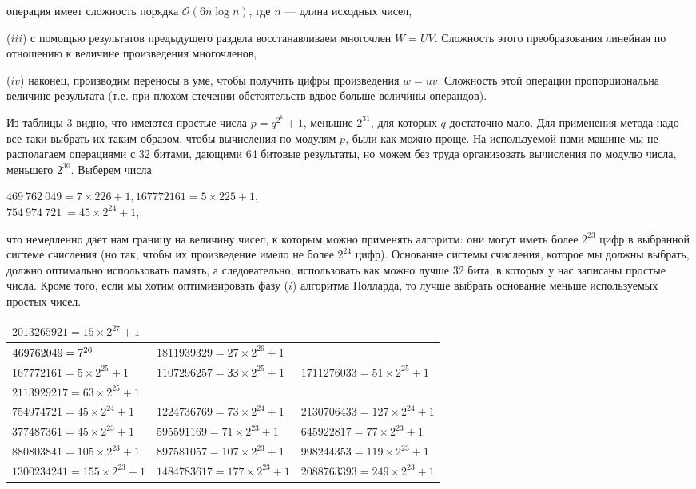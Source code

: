 \noindent операция имеет сложность порядка $\mathcal{O}(6n\log{}n)$, где $n$ --- длина исходных чисел, \par
  ($iii$) с помощью результатов предыдущего раздела 
восстанавливаем многочлен $W = UV$. Сложность этого преобразования линейная по отношению к величине произведения многочленов, \par
 ($iv$) наконец, производим переносы в уме, чтобы получить цифры
произведения $w = uv$. Сложность этой операции пропорциональна 
величине результата (т.е. при плохом стечении обстоятельств вдвое больше
величины операндов).\par
 Из таблицы 3 видно, что имеются простые числа $p = q^{2^{k}} + 1$, 
меньшие $2^{31}$, для которых $q$ достаточно мало. Для применения метода надо
все-таки выбрать их таким образом, чтобы вычисления по модулям $p$,
были как можно проще. На используемой нами машине мы не располагаем операциями с 32 битами, дающими 64 битовые результаты, но можем без труда организовать вычисления по модулю числа, меньшего $2^{30}$. Выберем числа
\begin{center}
$469\ 762\ 049 = 7 \times 226 + 1, 167 772 161 = 5 \times 225 + 1,$ \\
$754\ 974\ 721\ = 45 \times 2^{24} + 1,$
\end{center}
что немедленно дает нам границу на величину чисел, к которым 
можно применять алгоритм: они могут иметь более $2^{23}$ цифр в выбранной
системе счисления (но так, чтобы их произведение имело не более $2^{24}$
цифр). Основание системы счисления, которое мы должны выбрать, должно оптимально использовать память, а следовательно, использовать как можно лучше 32 бита, в которых у нас записаны простые числа. Кроме того, если мы хотим оптимизировать фазу ($i$) алгоритма Полларда, то лучше выбрать основание меньше используемых простых чисел. 
\begin{table}[h]
\centering
\small
\begin{tabular}{|l l l|}
\hline
$2013265921=15\times2^{27}+1$ & & \\ 

\hline
$469762049=7\time 2^{26}$ & $1811939329=27\times2^{26}+1$ & \\  

\hline
$167772161=5\times2^{25} + 1$ & $1107296257=ЗЗ\times2^{25}+1$ & $1711276033=51\times2^{25}+1$  \\
$2113929217=63\times2^{25}+1$ & & \\

\hline
$754974721=45\times2^{24}+1$ & $1224736769 = 73\times2^{24}+1$ & $2130706433=127\times2^{24}+1$  \\

\hline
$377487361=45\times2^{23}+1$ & $595591169=71\times2^{23}+1$ & $645922817=77\times2^{23}+1$ \\
$880803841=105\times2^{23}+1$ & $897581057=107\times2^{23}+1$ & $998244353=119\times2^{23}+1$ \\  
$1300234241=155 \times 2^{23}+1$ & $1484783617=177\times2^{23}+1$ & $2088763393=249\times2^{23}+1$ \\
 
\hline
\end{tabular}
\end{table}
